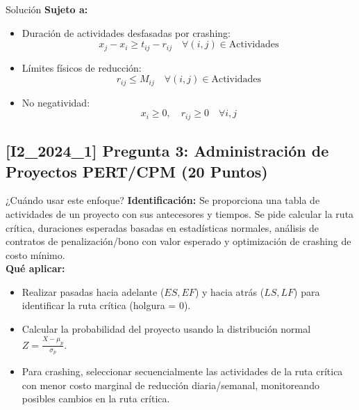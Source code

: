 \documentclass[11pt, a4paper]{article}
\begin{document}
\begin{ejercicio}{Solución}
  \textbf{Sujeto a:}
  \begin{itemize}
    \item Duración de actividades desfasadas por crashing:
      \begin{equation}
        x_j - x_i \ge t_{ij} - r_{ij} \quad \forall (i,j) \in \text{Actividades}
      \end{equation}
    \item Límites físicos de reducción:
      \begin{equation}
        r_{ij} \le M_{ij} \quad \forall (i,j) \in \text{Actividades}
      \end{equation}
    \item No negatividad:
      \begin{equation}
        x_i \ge 0, \quad r_{ij} \ge 0 \quad \forall i, j
      \end{equation}
  \end{itemize}

\end{ejercicio}

\newpage

\subsection*{[I2_2024_1] Pregunta 3: Administración de Proyectos PERT/CPM (20 Puntos)}
\begin{tipprueba}{¿Cuándo usar este enfoque?}
    \textbf{Identificación:} Se proporciona una tabla de actividades de un proyecto con sus antecesores y tiempos. Se pide calcular la ruta crítica, duraciones esperadas basadas en estadísticas normales, análisis de contratos de penalización/bono con valor esperado y optimización de crashing de costo mínimo.\\
    \textbf{Qué aplicar:}
    \begin{itemize}
      \item Realizar pasadas hacia adelante ($ES, EF$) y hacia atrás ($LS, LF$) para identificar la ruta crítica (holgura = 0).
      \item Calcular la probabilidad del proyecto usando la distribución normal $Z = \frac{X - \mu_p}{\sigma_p}$.
      \item Para crashing, seleccionar secuencialmente las actividades de la ruta crítica con menor costo marginal de reducción diaria/semanal, monitoreando posibles cambios en la ruta crítica.
    \end{itemize}
  \end{tipprueba}
\end{document}
